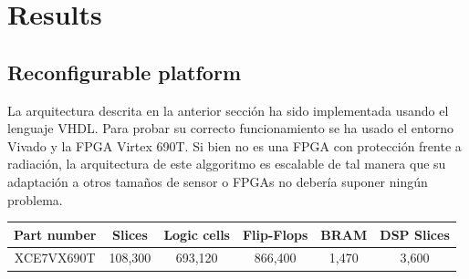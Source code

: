 \cleardoublepage
\chapter{Results}
\label{makereference}
\section{Reconfigurable platform}
La arquitectura descrita en la anterior sección ha sido implementada usando el lenguaje VHDL. Para probar su correcto funcionamiento se ha usado el entorno Vivado y la FPGA Virtex 690T. Si bien no es una FPGA con protección frente a radiación, la arquitectura de este alggoritmo es escalable de tal manera que su adaptación a otros tamaños de sensor o FPGAs no debería suponer ningún problema.

\begin{center}
 \begin{tabular}{|c|c|c|c|c|c|} 
 \hline
 Part number & Slices & Logic cells & Flip-Flops & BRAM & DSP Slices \\
 \hline
 XCE7VX690T & 108,300 & 693,120 & 866,400 & 1,470 & 3,600\\
 \hline
\end{tabular}
\end{center}

